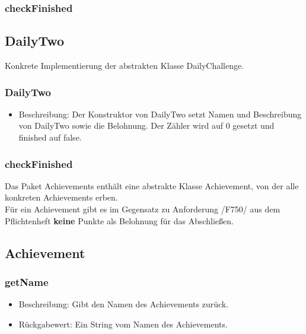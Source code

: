 \documentclass[a4paper]{scrreprt}
\begin{document}
	\subsubsection{checkFinished}
	
	\subsection{DailyTwo}
	Konkrete Implementierung der abstrakten Klasse DailyChallenge.
	\subsubsection{DailyTwo}
	\begin{itemize}
		\item Beschreibung: Der Konstruktor von DailyTwo setzt Namen und Beschreibung von DailyTwo sowie die Belohnung. Der Zähler wird auf 0 gesetzt und finished auf false.
	\end{itemize}
	\subsubsection{checkFinished}
	
	Das Paket Achievements enthält eine abstrakte Klasse Achievement, von der alle konkreten Achievements erben. \\
	Für ein Achievement gibt es im Gegensatz zu Anforderung /F750/ aus dem Pflichtenheft \textbf{keine} Punkte als Belohnung für das Abschließen.
	
	\subsection{Achievement}
	\subsubsection{getName}
	\begin{itemize}
		\item Beschreibung: Gibt den Namen des Achievements zurück.
		\item Rückgabewert: Ein String vom Namen des Achievements.
	\end{itemize}
\end{document}
